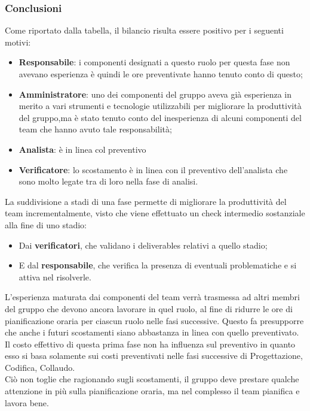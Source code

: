 \subsubsection{Conclusioni}
Come riportato dalla tabella, il bilancio risulta essere positivo per i seguenti motivi:
\begin{itemize}
	\item \textbf{Responsabile}: {i componenti designati a questo ruolo per questa fase non avevano esperienza è quindi le ore preventivate hanno tenuto conto di questo; }
	\item \textbf{Amministratore}: {uno dei componenti del gruppo aveva già esperienza in merito a vari strumenti e tecnologie utilizzabili per migliorare la produttività del gruppo,ma è stato tenuto 
	conto del inesperienza di alcuni componenti del team che hanno avuto tale responsabilità;}
	\item \textbf{Analista}: {è in linea col preventivo}
	\item \textbf{Verificatore}: {lo scostamento è in linea con il preventivo dell'analista che sono molto legate tra di loro nella fase di analisi.}
\end{itemize}
La suddivisione a stadi di una fase permette di migliorare la produttività del team incrementalmente, visto che viene effettuato un check intermedio sostanziale alla fine di uno stadio:
\begin{itemize}
	\item Dai \textbf{verificatori}, che validano i deliverables relativi a quello stadio;
	\item E dal \textbf{responsabile}, che verifica la presenza di eventuali problematiche e si attiva nel risolverle.
\end{itemize}
L'esperienza maturata dai componenti del team verrà trasmessa ad altri membri del gruppo che devono ancora lavorare in quel ruolo, al fine di ridurre le ore di pianificazione oraria per ciascun ruolo nelle fasi successive.
Questo fa presupporre che anche i futuri scostamenti siano abbastanza in linea con quello preventivato.
Il costo effettivo di questa prima fase non ha influenza sul preventivo in quanto esso si basa solamente sui costi preventivati nelle fasi successive di Progettazione, Codifica, Collaudo.\\
Ciò non toglie che ragionando sugli scostamenti, il gruppo deve prestare qualche attenzione in più sulla pianificazione oraria, ma nel complesso il team pianifica e lavora bene.
